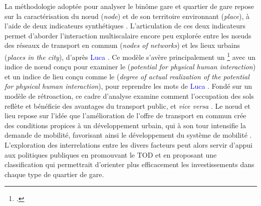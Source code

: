 \begin{refsegment}
La méthodologie adoptée pour analyser le binôme gare et quartier de gare repose sur la caractérisation du nœud (\textsl{node}) et de son territoire environnant (\textsl{place}), à l'aide de deux indicateurs synthétiques \textcolor{blue}{\autocites[343]{bertolini_nodes_1996}[199]{bertolini_spatial_1999}}. L'articulation de ces deux indicateurs permet d'aborder l'interaction multiscalaire encore peu explorée entre les nœuds des réseaux de transport en commun (\textsl{nodes of networks}) et les lieux urbains (\textsl{places in the city}), d'après \textcolor{blue}{Luca} \textcolor{blue}{\textcite[344]{bertolini_nodes_1996}}. Ce modèle s'avère principalement un \footnote{
     \textcolor{blue}{\autocite[199-201]{bertolini_spatial_1999}}.
} avec un indice de nœud conçu pour examiner le  (\textsl{potential for physical human interaction}) et un indice de lieu conçu comme le  (\textsl{degree of actual realization of the potential for physical human interaction}), pour reprendre les mots de \textcolor{blue}{Luca} \textcolor{blue}{\textcite[199-201]{bertolini_spatial_1999}}. Fondé sur un modèle de rétroaction, ce cadre d'analyse examine comment l'occupation des sols reflète et bénéficie des avantages du transport public, et \textsl{vice versa} \textcolor{blue}{\autocite[47]{chorus_application_2011}}. Le  nœud et lieu repose sur l'idée que l'amélioration de l'offre de transport en commun crée des conditions propices à un développement urbain, qui à son tour intensifie la demande de mobilité, favorisant ainsi le développement du système de mobilité \textcolor{blue}{\autocite[47]{chorus_application_2011}}. L'exploration des interrelations entre les divers facteurs peut alors servir d'appui aux politiques publiques en promouvant le \acrshort{TOD} et en proposant une classification qui permettrait d'orienter plus efficacement les investissements dans chaque type de quartier de gare.%


\end{refsegment}
